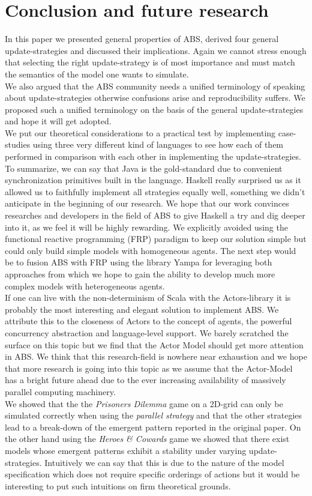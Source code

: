 \section{Conclusion and future research}
In this paper we presented general properties of ABS, derived four general update-strategies and discussed their implications. Again we cannot stress enough that selecting the right update-strategy is of most importance and must match the semantics of the model one wants to simulate. \\
We also argued that the ABS community needs a unified terminology of speaking about update-strategies otherwise confusions arise and reproducibility suffers. We proposed such a unified terminology on the basis of the general update-strategies and hope it will get adopted. \\
We put our theoretical considerations to a practical test by implementing case-studies using three very different kind of languages to see how each of them performed in comparison with each other in implementing the update-strategies. To summarize, we can say that Java is the gold-standard due to convenient synchronization primitives built in the language. Haskell really surprised us as it allowed us to faithfully implement all strategies equally well, something we didn't anticipate in the beginning of our research. We hope that our work convinces researches and developers in the field of ABS to give Haskell a try and dig deeper into it, as we feel it will be highly rewarding. We explicitly avoided using the functional reactive programming (FRP) paradigm to keep our solution simple but could only build simple models with homogeneous agents. The next step would be to fusion ABS with FRP using the library Yampa for leveraging both approaches from which we hope to gain the ability to develop much more complex models with heterogeneous agents.  \\
If one can live with the non-determinism of Scala with the Actors-library it is probably the most interesting and elegant solution to implement ABS. We attribute this to the closeness of Actors to the concept of agents, the powerful concurrency abstraction and language-level support. We barely scratched the surface on this topic but we find that the Actor Model should get more attention in ABS. We think that this research-field is nowhere near exhaustion and we hope that more research is going into this topic as we assume that the Actor-Model has a bright future ahead due to the ever increasing availability of massively parallel computing machinery. \\
We showed that the the \textit{Prisoners Dilemma} game on a 2D-grid can only be simulated correctly when using the \textit{parallel strategy} and that the other strategies lead to a break-down of the emergent pattern reported in the original paper. On the other hand using the \textit{Heroes \& Cowards} game we showed that there exist models whose emergent patterns exhibit a stability under varying update-strategies. Intuitively we can say that this is due to the nature of the model specification which does not require specific orderings of actions but it would be interesting to put such intuitions on firm theoretical grounds.